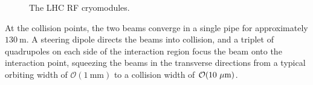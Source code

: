 \begin{figure}[htbp]
	\centering
	\hfill
	\caption{The LHC RF cryomodules.}
	\label{fig:RF-module}
\end{figure}

At the collision points, the two beams converge in a single pipe for approximately $130~\mbox{m}$. A steering dipole directs the beams into collision, and a triplet of quadrupoles on each side of the interaction region focus the beam onto the interaction point, squeezing the beams in the transverse directions from a typical orbiting width of $\mathcal{O}(1~\mbox{mm})$ to a collision width of $\mathcal{O}(10~\mu\mathrm{m})$. 


